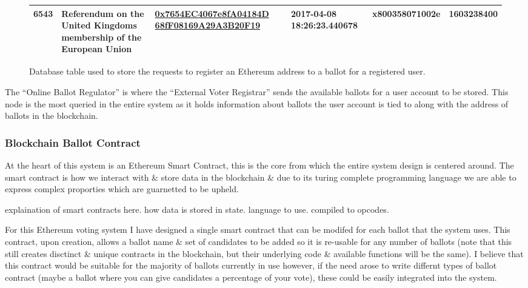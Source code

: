 \documentclass{article}
\begin{document}
\begin{figure}[h]
{\begin{tabular}{ | l | p{4cm} | p{4cm} | p{2.5cm} | p{2.5cm} | l |}
    		6543 & Referendum on the United Kingdoms membership of the European Union & \href{https://etherscan.io/address/0x7654EC4067e8fA04184D68fF08169A29A3B20F19}{0x7654EC4067e8fA04184D
    		68fF08169A29A3B20F19} & 2017-04-08 18:26:23.440678 & x800358071002e & 1603238400  \\ \hline 		
    		
    	\end{tabular}
  	}%
    
	\caption{Database table used to store the requests to register an Ethereum address to a ballot for a registered user.}
\end{figure}

The ``Online Ballot Regulator'' is where the ``External Voter Registrar'' sends the available ballots for a user account to be stored. This node is the most queried in the entire system as it holds information about ballots the user account is tied to along with the address of ballots in the blockchain.

\subsubsection{Blockchain Ballot Contract}
At the heart of this system is an Ethereum Smart Contract, this is the core from which the entire system design is centered around. The smart contract is how we interact with \& store data in the blockchain \& due to its turing complete programming language we are able to express complex proporties which are guarnetted to be upheld. 

{\Large explaination of smart contracts here. how data is stored in state. language to use. compiled to opcodes.}

For this Ethereum voting system I have designed a single smart contract that can be modifed for each ballot that the system uses. This contract, upon creation, allows a ballot name \& set of candidates to be added so it is re-usable for any number of ballots (note that this still creates disctinct \& unique contracts in the blockchain, but their underlying code \& available functions will be the same). I believe that this contract would be suitable for the majority of ballots currently in use however, if the need arose to write differnt types of ballot contract (maybe a ballot where you can give candidates a percentage of your vote), these could be easily integrated into the system.
\end{document}
